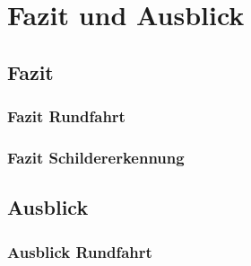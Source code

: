 \section{Fazit und Ausblick}
\subsection{Fazit}
\subsubsection{Fazit Rundfahrt}
\subsubsection{Fazit Schildererkennung}
\subsection{Ausblick}
\subsubsection{Ausblick Rundfahrt}
